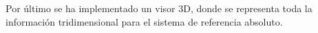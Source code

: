 Por último se ha implementado un visor 3D, donde se representa toda la información tridimensional para el sistema de referencia absoluto.




%
%
%
%
%

